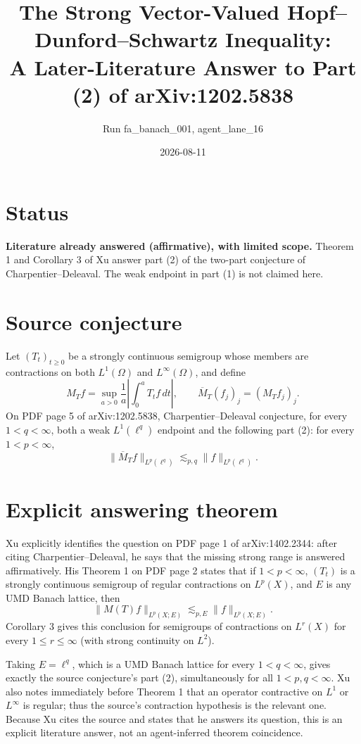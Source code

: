 \documentclass[11pt]{article}
\title{The Strong Vector-Valued Hopf--Dunford--Schwartz Inequality:\\
A Later-Literature Answer to Part (2) of arXiv:1202.5838}
\author{Run fa\_banach\_001, agent\_lane\_16}
\date{2026-08-11}
\begin{document}
\maketitle

\section*{Status}

\textbf{Literature already answered (affirmative), with limited scope.}
Theorem 1 and Corollary 3 of Xu answer part (2) of the two-part conjecture of
Charpentier--Deleaval.  The weak endpoint in part (1) is not claimed here.

\section*{Source conjecture}

Let $(T_t)_{t\ge0}$ be a strongly continuous semigroup whose members are
contractions on both $L^1(\Omega)$ and $L^\infty(\Omega)$, and define
\[
 M_Tf=\sup_{a>0}\frac1a\left|\int_0^aT_tf\,dt\right|,
 \qquad \overline M_T(f_j)_j=(M_Tf_j)_j.
\]
On PDF page 5 of arXiv:1202.5838, Charpentier--Deleaval conjecture, for every
$1<q<\infty$, both a weak $L^1(\ell^q)$ endpoint and the following part (2):
for every $1<p<\infty$,
\[
 \|\overline M_Tf\|_{L^p(\ell^q)}
 \lesssim_{p,q}\|f\|_{L^p(\ell^q)}.
\]

\section*{Explicit answering theorem}

Xu explicitly identifies the question on PDF page 1 of arXiv:1402.2344: after
citing Charpentier--Deleaval, he says that the missing strong range is answered
affirmatively.  His Theorem 1 on PDF page 2 states that if $1<p<\infty$,
$(T_t)$ is a strongly continuous semigroup of regular contractions on
$L^p(X)$, and $E$ is any UMD Banach lattice, then
\[
 \|M(T)f\|_{L^p(X;E)}\lesssim_{p,E}\|f\|_{L^p(X;E)}.
\]
Corollary 3 gives this conclusion for semigroups of contractions on $L^r(X)$
for every $1\le r\le\infty$ (with strong continuity on $L^2$).

Taking $E=\ell^q$, which is a UMD Banach lattice for every
$1<q<\infty$, gives exactly the source conjecture's part (2), simultaneously
for all $1<p,q<\infty$.  Xu also notes immediately before Theorem 1 that an
operator contractive on $L^1$ or $L^\infty$ is regular; thus the source's
contraction hypothesis is the relevant one.  Because Xu cites the source and
states that he answers its question, this is an explicit literature answer,
not an agent-inferred theorem coincidence.
\end{document}

